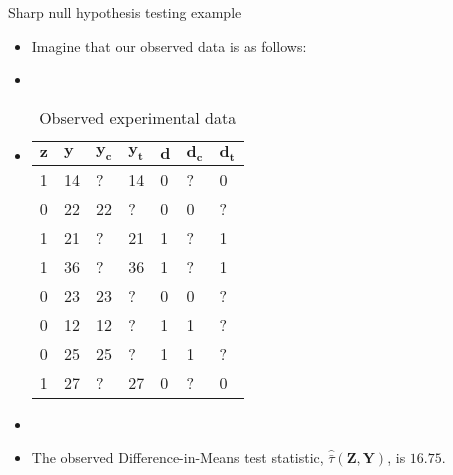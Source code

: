 \documentclass[table, xcolor={dvipsnames}, 9pt]{beamer}
\theoremstyle{newstyle}
\begin{document}
\begin{frame}{Sharp null hypothesis testing example}
\begin{itemize}
\item Imagine that our observed data is as follows: \pause 
\item[]
\item []\begin{table}[H]
\centering
    \begin{tabular}{l|l|l|l|l|l|l}
    $\mathbf{z}$ & $\mathbf{y}$ & $\mathbf{y_c}$ & $\mathbf{y_t}$ & $\mathbf{d}$ & $\mathbf{d_c}$ & $\mathbf{d_t}$ \\ \hline
    1 & 14 & ? & 14 & 0 & ? & 0 \\
    0 & 22 & 22 & ? & 0 & 0 & ? \\
    1 & 21 & ? & 21 & 1 & ? & 1 \\
    1 & 36 & ? & 36 & 1 & ? & 1 \\
    0 & 23 & 23 & ? & 0 & 0 & ? \\
    0 & 12 & 12 & ? & 1 & 1 & ? \\
    0 & 25 & 25 & ? & 1 & 1 & ? \\
    1 & 27 & ?  & 27 & 0 & ? & 0\\
    \end{tabular}
    \caption{Observed experimental data}
\end{table} \pause 
\item[]
\item The observed Difference-in-Means test statistic, $\hat{\bar{\tau}}\left(\mathbf{Z}, \mathbf{Y}\right)$, is $16.75$.  
\end{itemize}

\end{frame}
\end{document}
